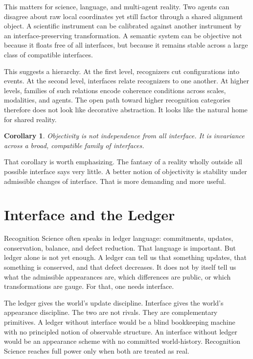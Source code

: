 \documentclass[11pt]{article}
\newtheorem{corollary}{Corollary}
\begin{document}
This matters for science, language, and multi-agent reality.
Two agents can disagree about raw local coordinates yet still factor through a shared alignment object.
A scientific instrument can be calibrated against another instrument by an interface-preserving transformation.
A semantic system can be objective not because it floats free of all interfaces, but because it remains stable across a large class of compatible interfaces.

This suggests a hierarchy.
At the first level, recognizers cut configurations into events.
At the second level, interfaces relate recognizers to one another.
At higher levels, families of such relations encode coherence conditions across scales, modalities, and agents.
The open path toward higher recognition categories therefore does not look like decorative abstraction.
It looks like the natural home for shared reality.

\begin{corollary}
Objectivity is not independence from all interface.
It is invariance across a broad, compatible family of interfaces.
\end{corollary}

\noindent
That corollary is worth emphasizing.
The fantasy of a reality wholly outside all possible interface says very little.
A better notion of objectivity is stability under admissible changes of interface.
That is more demanding and more useful.

\section{Interface and the Ledger}

Recognition Science often speaks in ledger language: commitments, updates, conservation, balance, and defect reduction.
That language is important.
But ledger alone is not yet enough.
A ledger can tell us that something updates, that something is conserved, and that defect decreases.
It does not by itself tell us what the admissible appearances are, which differences are public, or which transformations are gauge.
For that, one needs interface.

The ledger gives the world's update discipline.
Interface gives the world's appearance discipline.
The two are not rivals.
They are complementary primitives.
A ledger without interface would be a blind bookkeeping machine with no principled notion of observable structure.
An interface without ledger would be an appearance scheme with no committed world-history.
Recognition Science reaches full power only when both are treated as real.
\end{document}
